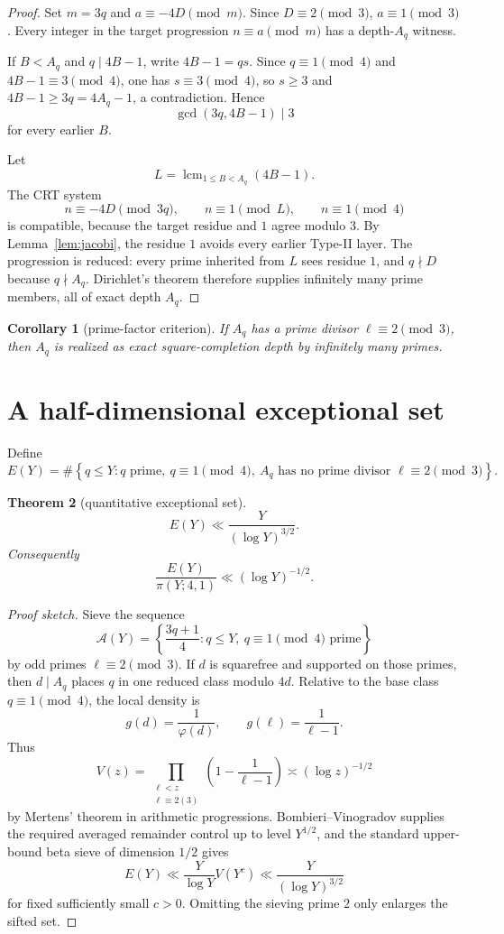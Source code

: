 \documentclass[11pt]{article}
\newtheorem{theorem}{Theorem}
\newtheorem{corollary}[theorem]{Corollary}
\theoremstyle{definition}
\begin{document}
\begin{proof}
Set $m=3q$ and $a\equiv-4D\pmod m$. Since $D\equiv2\pmod3$, $a\equiv1\pmod3$. Every integer in the target progression $n\equiv a\pmod m$ has a depth-$A_q$ witness.

If $B<A_q$ and $q\mid4B-1$, write $4B-1=qs$. Since $q\equiv1\pmod4$ and $4B-1\equiv3\pmod4$, one has $s\equiv3\pmod4$, so $s\ge3$ and $4B-1\ge3q=4A_q-1$, a contradiction. Hence
\[
\gcd(3q,4B-1)\mid3
\]
for every earlier $B$.

Let
\[
L=\operatorname{lcm}_{1\le B<A_q}(4B-1).
\]
The CRT system
\[
n\equiv-4D\pmod{3q},
\qquad
n\equiv1\pmod L,
\qquad
n\equiv1\pmod4
\]
is compatible, because the target residue and $1$ agree modulo $3$. By Lemma~\ref{lem:jacobi}, the residue $1$ avoids every earlier Type-II layer. The progression is reduced: every prime inherited from $L$ sees residue $1$, and $q\nmid D$ because $q\nmid A_q$. Dirichlet's theorem therefore supplies infinitely many prime members, all of exact depth $A_q$.
\end{proof}

\begin{corollary}[prime-factor criterion]\label{cor:factor}
If $A_q$ has a prime divisor $\ell\equiv2\pmod3$, then $A_q$ is realized as exact square-completion depth by infinitely many primes.
\end{corollary}

\section{A half-dimensional exceptional set}
Define
\[
E(Y)=\#\left\{q\le Y:q\text{ prime},\ q\equiv1\pmod4,
\ A_q\text{ has no prime divisor }\ell\equiv2\pmod3\right\}.
\]

\begin{theorem}[quantitative exceptional set]\label{thm:exceptional}
\[
\boxed{E(Y)\ll\frac{Y}{(\log Y)^{3/2}}.}
\]
Consequently
\[
\frac{E(Y)}{\pi(Y;4,1)}\ll(\log Y)^{-1/2}.
\]
\end{theorem}

\begin{proof}[Proof sketch]
Sieve the sequence
\[
\mathcal A(Y)=\left\{\frac{3q+1}{4}:q\le Y,\ q\equiv1\pmod4\text{ prime}\right\}
\]
by odd primes $\ell\equiv2\pmod3$. If $d$ is squarefree and supported on those primes, then $d\mid A_q$ places $q$ in one reduced class modulo $4d$. Relative to the base class $q\equiv1\pmod4$, the local density is
\[
g(d)=\frac1{\varphi(d)},
\qquad
g(\ell)=\frac1{\ell-1}.
\]
Thus
\[
V(z)=\prod_{\substack{\ell<z\\\ell\equiv2(3)}}
\left(1-\frac1{\ell-1}\right)
\asymp(\log z)^{-1/2}
\]
by Mertens' theorem in arithmetic progressions. Bombieri--Vinogradov supplies the required averaged remainder control up to level $Y^{1/2}$, and the standard upper-bound beta sieve of dimension $1/2$ gives
\[
E(Y)\ll\frac{Y}{\log Y}V(Y^c)
\ll\frac{Y}{(\log Y)^{3/2}}
\]
for fixed sufficiently small $c>0$. Omitting the sieving prime $2$ only enlarges the sifted set.
\end{proof}
\end{document}
